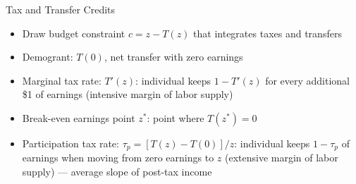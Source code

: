 \documentclass[10pt]{extarticle}
\begin{document}
  \begin{problem}{Tax and Transfer Credits}
    \begin{itemize}
      \item Draw budget constraint $c = z - T(z)$ that integrates taxes and transfers
      \item Demogrant: $T(0)$, net transfer with zero earnings
      \item Marginal tax rate: $T'(z)$: individual keeps $1-T'(z)$ for every additional \$1 of earnings (intensive margin of labor supply)
      \item Break-even earnings point $z^{\ast}$: point where $T(z^{\ast}) = 0$
      \item Participation tax rate: $\tau_p = [T(z)-T(0)]/z$: individual keeps $1-\tau_p$ of earnings when moving from zero earnings to $z$ (extensive margin of labor supply) --- average slope of post-tax income
    \end{itemize}
  \end{problem}
\end{document}
